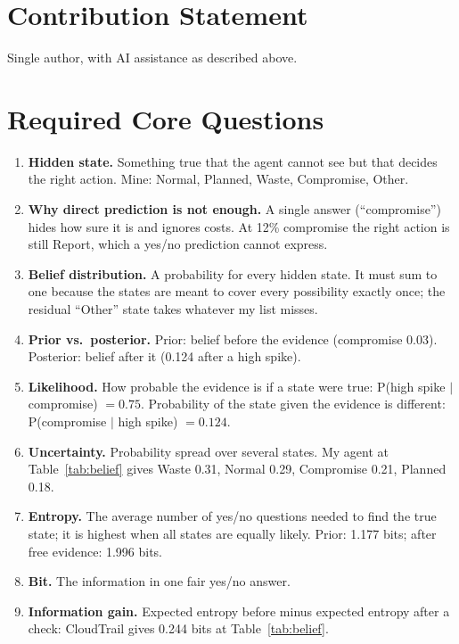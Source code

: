 \documentclass{article}
\begin{document}
\section*{Contribution Statement}
Single author, with AI assistance as described above.



\appendix
\onecolumn
\section{Required Core Questions}

\begin{enumerate}\small
\item \textbf{Hidden state.} Something true that the agent cannot see but that decides the right action. Mine: Normal, Planned, Waste, Compromise, Other.
\item \textbf{Why direct prediction is not enough.} A single answer (``compromise'') hides how sure it is and ignores costs. At 12\% compromise the right action is still Report, which a yes/no prediction cannot express.
\item \textbf{Belief distribution.} A probability for every hidden state. It must sum to one because the states are meant to cover every possibility exactly once; the residual ``Other'' state takes whatever my list misses.
\item \textbf{Prior vs.\ posterior.} Prior: belief before the evidence (compromise 0.03). Posterior: belief after it (0.124 after a high spike).
\item \textbf{Likelihood.} How probable the evidence is if a state were true: P(high spike $\mid$ compromise) $=0.75$. Probability of the state given the evidence is different: P(compromise $\mid$ high spike) $=0.124$.
\item \textbf{Uncertainty.} Probability spread over several states. My agent at Table~\ref{tab:belief} gives Waste 0.31, Normal 0.29, Compromise 0.21, Planned 0.18.
\item \textbf{Entropy.} The average number of yes/no questions needed to find the true state; it is highest when all states are equally likely. Prior: 1.177 bits; after free evidence: 1.996 bits.
\item \textbf{Bit.} The information in one fair yes/no answer.
\item \textbf{Information gain.} Expected entropy before minus expected entropy after a check: CloudTrail gives 0.244 bits at Table~\ref{tab:belief}.

\end{enumerate}
\end{document}
